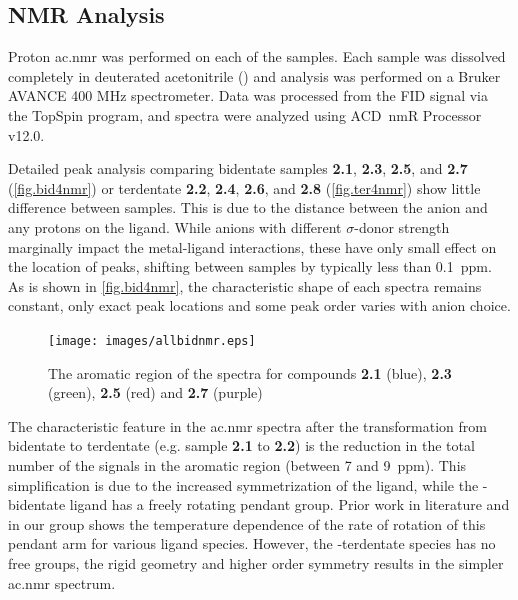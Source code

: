 \subsection{NMR Analysis}

Proton \gls{ac.nmr} was performed on each of the samples. Each sample was dissolved completely in deuterated acetonitrile () and analysis was performed on a Bruker AVANCE 400 MHz spectrometer. Data was processed from the FID signal via the TopSpin program, and spectra were analyzed using ACD~nmR Processor v12.0. 

Detailed peak analysis comparing bidentate samples \textbf{2.1}, \textbf{2.3}, \textbf{2.5}, and \textbf{2.7} (\autoref{fig.bid4nmr}) or terdentate \textbf{2.2}, \textbf{2.4}, \textbf{2.6}, and \textbf{2.8} (\autoref{fig.ter4nmr}) show little difference between samples. This is due to the distance between the anion and any protons on the ligand. While anions with different $\sigma$-donor strength marginally impact the metal-ligand interactions, these have only small effect on the location of peaks, shifting between samples by typically less than 0.1~ppm. As is shown in \autoref{fig.bid4nmr}, the characteristic shape of each spectra remains constant, only exact peak locations and some peak order varies with anion choice. 


\begin{figure}[!htb]
 \begin{center}
  \texttt{[image: images/allbidnmr.eps]}
 \end{center}
\caption[The aromatic region of the \texorpdfstring{}{1H}  spectra of the four bidentate compounds]{The aromatic region of the \texorpdfstring{}{1H}  spectra for compounds \textbf{2.1} (blue), \textbf{2.3} (green), \textbf{2.5} (red) and \textbf{2.7} (purple)}
\label{fig.bid4nmr}
\end{figure} 

The characteristic feature in the \gls{ac.nmr} spectra after the transformation from bidentate to terdentate (e.g. sample \textbf{2.1} to \textbf{2.2}) is the reduction in the total number of the signals in the aromatic region (between 7 and 9~ppm). This simplification is due to the increased symmetrization of the ligand, while the -bidentate ligand has a freely rotating pendant group. Prior work in literature\autocite{abel1993} and in our group\autocite{jurca2012} shows the temperature dependence of the rate of rotation of this pendant arm for various ligand species. However, the -terdentate species has no free groups, the rigid geometry and higher order symmetry results in the simpler \gls{ac.nmr} spectrum.

